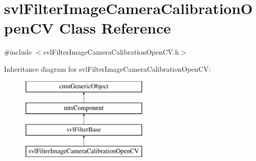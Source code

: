 \hypertarget{classsvl_filter_image_camera_calibration_open_c_v}{\section{svl\-Filter\-Image\-Camera\-Calibration\-Open\-C\-V Class Reference}
\label{classsvl_filter_image_camera_calibration_open_c_v}
}


{\ttfamily \#include $<$svl\-Filter\-Image\-Camera\-Calibration\-Open\-C\-V.\-h$>$}

Inheritance diagram for svl\-Filter\-Image\-Camera\-Calibration\-Open\-C\-V\-:\begin{figure}[H]
\begin{center}
\leavevmode
\includegraphics[height=4.000000cm]{d1/dc5/classsvl_filter_image_camera_calibration_open_c_v}
\end{center}
\end{figure}
